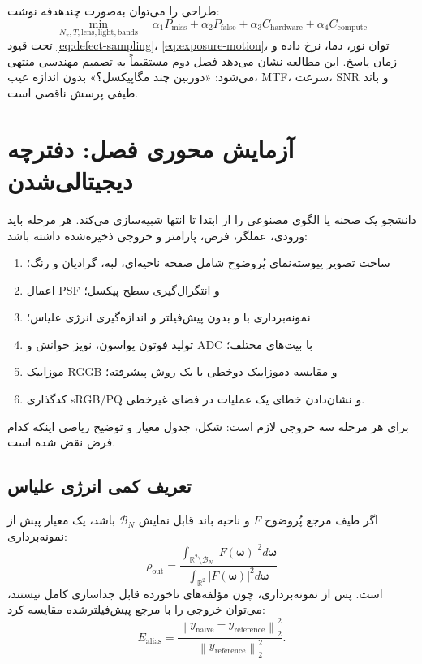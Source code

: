 \documentclass[12pt,openany,oneside]{book}
\newcommand{\R}{\mathbb{R}}
\newcommand{\norm}[1]{\left\lVert #1\right\rVert}
\newcommand{\abs}[1]{\left\lvert #1\right\rvert}
\newcommand{\vect}[1]{\bm{#1}}
\begin{document}
طراحی را می‌توان به‌صورت چندهدفه نوشت:
\begin{equation}
\min_{N_x,T,\text{lens},\text{light},\text{bands}}
\quad
\alpha_1 P_{\mathrm{miss}}
+\alpha_2 P_{\mathrm{false}}
+\alpha_3 C_{\mathrm{hardware}}
+\alpha_4 C_{\mathrm{compute}}
\end{equation}
تحت قیود \eqref{eq:defect-sampling}، \eqref{eq:exposure-motion}، توان نور، دما، نرخ داده و زمان پاسخ.
این مطالعه نشان می‌دهد فصل دوم مستقیماً به تصمیم مهندسی منتهی می‌شود: «دوربین چند مگاپیکسل؟»
بدون اندازه عیب، MTF، سرعت، SNR و باند طیفی پرسش ناقصی است.

\section{آزمایش محوری فصل: دفترچه دیجیتالی‌شدن}

\begin{workshopbox}
دانشجو یک صحنه یا الگوی مصنوعی را از ابتدا تا انتها شبیه‌سازی می‌کند. هر مرحله باید ورودی، عملگر،
فرض، پارامتر و خروجی ذخیره‌شده داشته باشد:
\begin{enumerate}
\item ساخت تصویر پیوسته‌نمای پُروضوح شامل صفحه ناحیه‌ای، لبه، گرادیان و رنگ؛
\item اعمال PSF و انتگرال‌گیری سطح پیکسل؛
\item نمونه‌برداری با و بدون پیش‌فیلتر و اندازه‌گیری انرژی علیاس؛
\item تولید فوتون پواسون، نویز خوانش و ADC با بیت‌های مختلف؛
\item موزاییک RGGB و مقایسه دموزاییک دوخطی با یک روش پیشرفته؛
\item کدگذاری sRGB/PQ و نشان‌دادن خطای یک عملیات در فضای غیرخطی.
\end{enumerate}
برای هر مرحله سه خروجی لازم است: شکل، جدول معیار و توضیح ریاضی اینکه کدام فرض نقض شده است.
\end{workshopbox}

\subsection{تعریف کمی انرژی علیاس}

اگر طیف مرجع پُروضوح \(F\) و ناحیه باند قابل نمایش \(\mathcal B_N\) باشد، یک معیار پیش از
نمونه‌برداری:
\begin{equation}
\rho_{\mathrm{out}}=
\frac{\int_{\R^2\setminus\mathcal B_N}\abs{F(\vect\omega)}^2d\vect\omega}
{\int_{\R^2}\abs{F(\vect\omega)}^2d\vect\omega}
\end{equation}
است. پس از نمونه‌برداری، چون مؤلفه‌های تاخورده قابل جداسازی کامل نیستند، می‌توان خروجی را با مرجع
پیش‌فیلترشده مقایسه کرد:
\begin{equation}
E_{\mathrm{alias}}=
\frac{\norm{y_{\mathrm{naive}}-y_{\mathrm{reference}}}_2^2}
{\norm{y_{\mathrm{reference}}}_2^2}.
\end{equation}
\end{document}
